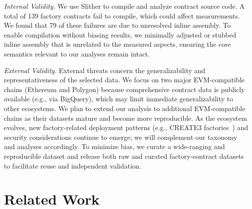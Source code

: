 \documentclass[acmsmall, screen]{acmart}
\begin{document}
	\textit{Internal Validity.} We use Slither to compile and analyze contract source code. A total
	of 139 factory contracts fail to compile, which could affect measurements. We found that 79 of
	these failures are due to unresolved inline assembly. To enable compilation without biasing results,
	we minimally adjusted or stubbed inline assembly that is unrelated to the measured aspects, ensuring
	the core semantics relevant to our analyses remain intact.

	\textit{External Validity.} External threats concern the generalizability and representativeness
	of the selected data. We focus on two major EVM-compatible chains (Ethereum and Polygon) because
	comprehensive contract data is publicly available (e.g., via BigQuery), which may limit
	immediate generalizability to other ecosystems. We plan to extend our analysis to additional EVM-compatible
	chains as their datasets mature and become more reproducible. As the ecosystem evolves, new factory-related
	deployment patterns (e.g., CREATE3 factories~\cite{eip-3171}) and security considerations continue
	to emerge; we will complement our taxonomy and analyses accordingly. To minimize bias, we curate
	a wide-ranging and reproducible dataset and release both raw and curated factory-contract
	datasets to facilitate reuse and independent validation.

	\section{Related Work}
	\label{sec:relatedwork}
\end{document}
